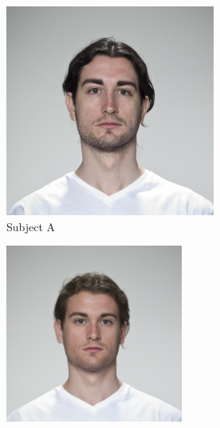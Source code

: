 \documentclass[12pt,twocolumn]{paper}
\begin{document}
\begin{figure}[t]
    \centering
    \begin{subfigure}{0.19\textwidth}
        \centering
        \includegraphics[width=\textwidth]{morph_example_A.png}
        \caption{Subject A}
        \label{morph_comp_1}
    \end{subfigure}
    \begin{subfigure}{0.19\textwidth}
        \centering
        \includegraphics[width=\textwidth]{landmark_morph.png}

\end{subfigure}
\end{figure}
\end{document}
